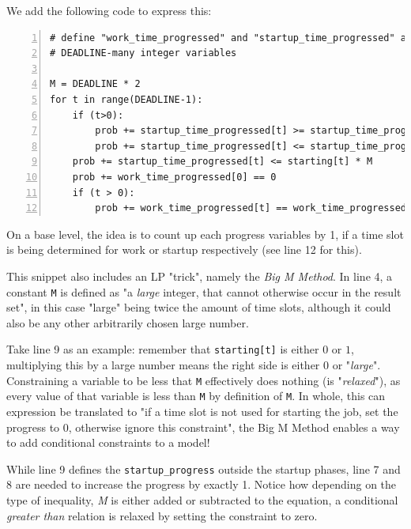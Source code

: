 We add the following code to express this:

\begin{minipage}{\linewidth}
\begin{lstlisting}[frame=single, numbers=left, caption={Progress Variables in LP}, label={list:lp_progress}, basicstyle=\ttfamily, breaklines]
# define "work_time_progressed" and "startup_time_progressed" as 
# DEADLINE-many integer variables

M = DEADLINE * 2
for t in range(DEADLINE-1):
    if (t>0):
        prob += startup_time_progressed[t] >= startup_time_progressed[t-1] + 1 - (1 - starting[t]) * M 
        prob += startup_time_progressed[t] <= startup_time_progressed[t-1] + 1 + (1 - starting[t]) * M
    prob += startup_time_progressed[t] <= starting[t] * M 
    prob += work_time_progressed[0] == 0
    if (t > 0):
        prob += work_time_progressed[t] == work_time_progressed[t-1] + work[t]
\end{lstlisting}
\end{minipage}

On a base level, the idea is to count up each progress variables by 1, if a time slot is being determined for work or startup respectively (see line 12 for this).

This snippet also includes an LP "trick", namely the \emph{Big M Method}. 
In line 4, a constant \verb|M| is defined as "a \emph{large} integer, that cannot otherwise occur in the result set", in this case "large" being twice the amount of time slots, although it could also be any other arbitrarily chosen large number.

Take line 9 as an example: 
remember that \verb|starting[t]| is either $0$ or $1$, multiplying this by a large number means the right side is either $0$ or "\emph{large}". 
Constraining a variable to be less that \verb|M| effectively does nothing (is "\emph{relaxed}"), as every value of that variable is less than \verb|M| by definition of \verb|M|. 
In whole, this can expression be translated to "if a time slot is not used for starting the job, set the progress to 0, otherwise ignore this constraint", the Big M Method enables a way to add conditional constraints to a model!

While line 9 defines the \verb|startup_progress| outside the startup phases, line 7 and 8 are needed to increase the progress by exactly 1. 
Notice how depending on the type of inequality, \emph{M} is either added or subtracted to the equation, a conditional \emph{greater than} relation is relaxed by setting the constraint to zero.

